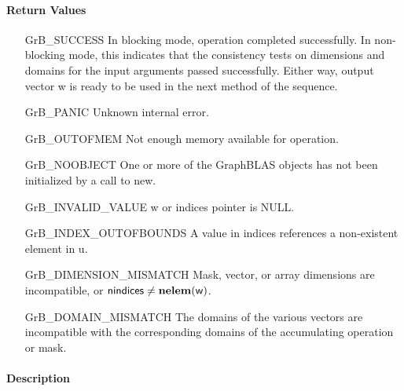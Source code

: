 \paragraph{Return Values}

\begin{itemize}[leftmargin=2.1in]
    \item[{\sf GrB\_SUCCESS}]         In blocking mode, operation
	completed successfully. In non-blocking mode, this indicates
	that the consistency tests on dimensions and domains for the
	input arguments passed successfully. Either way, output vector
	{\sf w} is ready to be used in the next method of the sequence.

    \item[{\sf GrB\_PANIC}]           Unknown internal error.
    
    \item[{\sf GrB\_OUTOFMEM}]        Not enough memory available for operation.
    
    \item[{\sf GrB\_NOOBJECT}]        One or more of the GraphBLAS objects has
    not been initialized by a call to {\sf new}.
    
    \item[{\sf GrB\_INVALID\_VALUE}]  {\sf w} or {\sf indices} pointer is {\sf NULL}.

    \item[{\sf GrB\_INDEX\_OUTOFBOUNDS}]  A value in {\sf indices} references a 
    non-existent element in {\sf u}.
    
    \item[{\sf GrB\_DIMENSION\_MISMATCH}] Mask, vector, or array dimensions are
    incompatible, or ${\sf nindices} \neq \bold{nelem}({\sf w})$. 
    
    \item[{\sf GrB\_DOMAIN\_MISMATCH}]    The domains of the various
	vectors are incompatible with the corresponding domains of the
	accumulating operation or mask.
\end{itemize}

\paragraph{Description}

